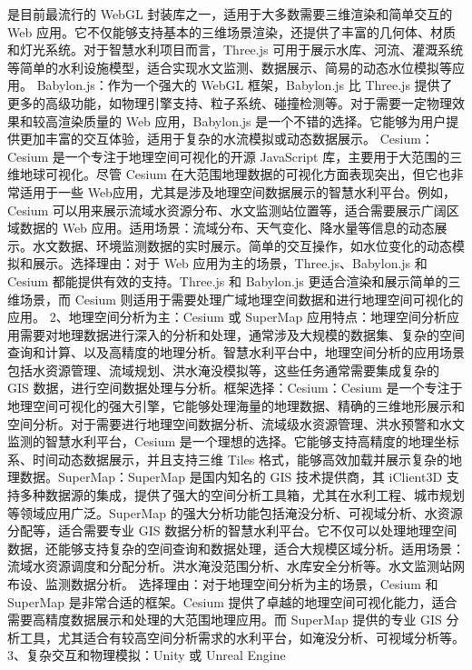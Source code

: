 {是目前最流行的 WebGL 封装库之一，适用于大多数需要三维渲染和简单交互的 Web 应用。它不仅能够支持基本的三维场景渲染，还提供了丰富的几何体、材质和灯光系统。对于智慧水利项目而言，Three.js
可用于展示水库、河流、灌溉系统等简单的水利设施模型，适合实现水文监测、数据展示、简易的动态水位模拟等应用。 Babylon.js：作为一个强大的 WebGL 框架，Babylon.js 比 Three.js
提供了更多的高级功能，如物理引擎支持、粒子系统、碰撞检测等。对于需要一定物理效果和较高渲染质量的 Web 应用，Babylon.js 是一个不错的选择。它能够为用户提供更加丰富的交互体验，适用于复杂的水流模拟或动态数据展示。
Cesium：Cesium 是一个专注于地理空间可视化的开源 JavaScript 库，主要用于大范围的三维地球可视化。尽管 Cesium 在大范围地理数据的可视化方面表现突出，但它也非常适用于一些
Web应用，尤其是涉及地理空间数据展示的智慧水利平台。例如，Cesium 可以用来展示流域水资源分布、水文监测站位置等，适合需要展示广阔区域数据的 Web
应用。适用场景：流域分布、天气变化、降水量等信息的动态展示。水文数据、环境监测数据的实时展示。简单的交互操作，如水位变化的动态模拟和展示。选择理由：对于 Web 应用为主的场景，Three.js、Babylon.js 和 Cesium
都能提供有效的支持。Three.js 和 Babylon.js 更适合渲染和展示简单的三维场景，而 Cesium 则适用于需要处理广域地理空间数据和进行地理空间可视化的应用。 2、地理空间分析为主：Cesium 或 SuperMap
应用特点：地理空间分析应用需要对地理数据进行深入的分析和处理，通常涉及大规模的数据集、复杂的空间查询和计算、以及高精度的地理分析。智慧水利平台中，地理空间分析的应用场景包括水资源管理、流域规划、洪水淹没模拟等，这些任务通常需要集成复杂的
GIS 数据，进行空间数据处理与分析。框架选择：Cesium：Cesium
是一个专注于地理空间可视化的强大引擎，它能够处理海量的地理数据、精确的三维地形展示和空间分析。对于需要进行地理空间数据分析、流域级水资源管理、洪水预警和水文监测的智慧水利平台，Cesium
是一个理想的选择。它能够支持高精度的地理坐标系、时间动态数据展示，并且支持三维 Tiles 格式，能够高效加载并展示复杂的地理数据。SuperMap：SuperMap 是国内知名的 GIS 技术提供商，其 iClient3D
支持多种数据源的集成，提供了强大的空间分析工具箱，尤其在水利工程、城市规划等领域应用广泛。SuperMap 的强大分析功能包括淹没分析、可视域分析、水资源分配等，适合需要专业 GIS
数据分析的智慧水利平台。它不仅可以处理地理空间数据，还能够支持复杂的空间查询和数据处理，适合大规模区域分析。适用场景：流域水资源调度和分配分析。洪水淹没范围分析、水库安全分析等。水文监测站网布设、监测数据分析。
选择理由：对于地理空间分析为主的场景，Cesium 和 SuperMap 是非常合适的框架。Cesium 提供了卓越的地理空间可视化能力，适合需要高精度数据展示和处理的大范围地理应用。而 SuperMap 提供的专业 GIS
分析工具，尤其适合有较高空间分析需求的水利平台，如淹没分析、可视域分析等。 3、复杂交互和物理模拟：Unity 或 Unreal Engine
}
